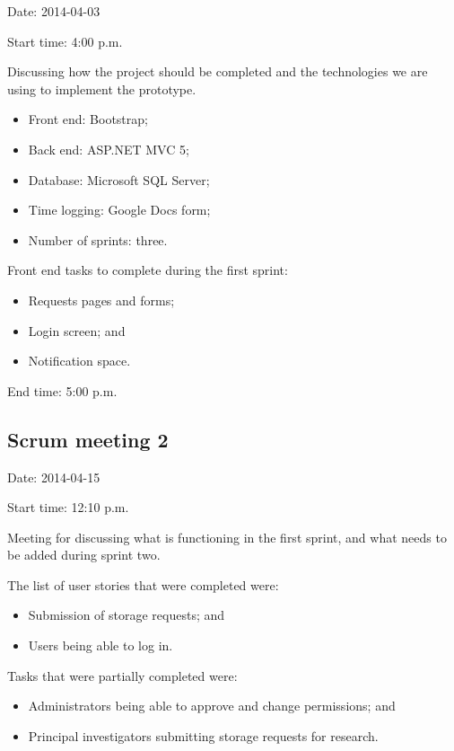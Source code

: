 \documentclass[a4paper,titlepage,12pt]{article}
\begin{document}
Date: 2014-04-03

Start time: 4:00 p.m.

Discussing how the project should be completed and the technologies we are
using to implement the prototype.

\begin{itemize}
	\item Front end: Bootstrap;
	\item Back end: ASP.NET MVC 5;
	\item Database: Microsoft SQL Server;
	\item Time logging: Google Docs form;
	\item Number of sprints: three.
\end{itemize}

Front end tasks to complete during the first sprint:

\begin{itemize}
	\item Requests pages and forms;
	\item Login screen; and
	\item Notification space.
\end{itemize}

End time: 5:00 p.m.

\newpage

\subsection{Scrum meeting 2}

Date: 2014-04-15

Start time: 12:10 p.m.

Meeting for discussing what is functioning in the first sprint, and what needs
to be added during sprint two.

The list of user stories that were completed were:

\begin{itemize}
	\item Submission of storage requests; and
	\item Users being able to log in.
\end{itemize}

Tasks that were partially completed were:

\begin{itemize}
	\item Administrators being able to approve and change permissions; and
	\item Principal investigators submitting storage requests for research.
\end{itemize}
\end{document}
